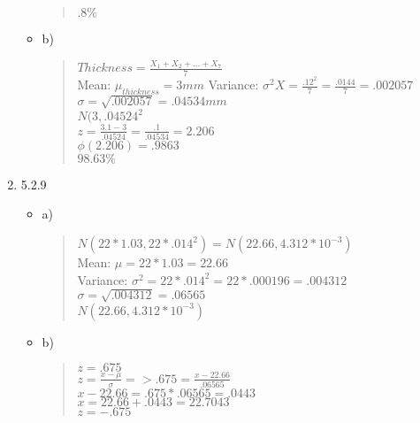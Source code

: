 \documentclass{article}
\begin{document}
\begin{enumerate}
\begin{itemize}
\begin{quote}
                $.8\%$
            \end{quote}
        \end{itemize}
        \begin{itemize}
            \item b)
            \begin{quote}
                $Thickness = \frac{X_{1}+X_{2}+...+X_{7}}{7}$ \\
                Mean: $\mu_{thickness} = 3mm$
                Variance: $\sigma^{2}X = \frac{.12^{2}}{7} = \frac{.0144}{7} = .002057$ \\
                $\sigma = \sqrt{.002057} = .04534 mm$ \\
                $N(3, .04524^{2}$ \\
                $z = \frac{3.1 - 3}{.04524} = \frac{.1}{.04534} = 2.206$ \\
                $\phi(2.206) = .9863$ \\
                $98.63\%$
            \end{quote}
        \end{itemize}
    \item 5.2.9 
        \begin{itemize}
            \item a)
            \begin{quote}
                $N(22*1.03, 22*.014^{2}) = N(22.66, 4.312*10^{-3})$ \\
                Mean: $\mu = 22*1.03 = 22.66$ \\
                Variance: $\sigma^{2} = 22*.014^{2} = 22*.000196 = .004312$ \\
                $\sigma = \sqrt{.004312} = .06565$ \\
                $N(22.66, 4.312*10^{-3})$
            \end{quote}
        \end{itemize}
        \begin{itemize}
            \item b)
            \begin{quote}
                $z = .675$ \\
                $z = \frac{x - \mu}{\sigma} => .675 = \frac{x - 22.66}{.06565}$ \\
                $x-22.66 = .675*.06565 = .0443$ \\
                $x = 22.66+.0443 = 22.7043$ \\
                $z = -.675$ \\

\end{quote}
\end{itemize}
\end{enumerate}
\end{document}
